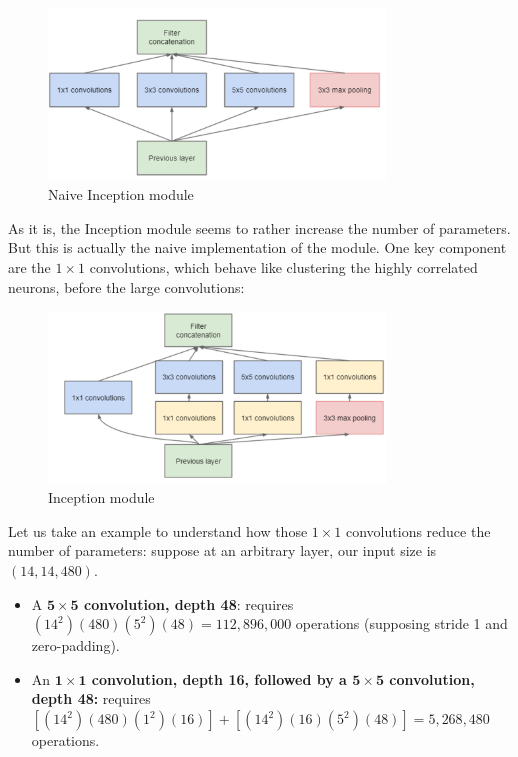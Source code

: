 \begin{figure}[H]
    \centering
    \includegraphics[width=0.8\textwidth]{Images/naiveinception.png}
    \caption{Naive Inception module \cite{googlenet}}
\end{figure}

As it is, the Inception module seems to rather increase the number of parameters. But this is actually the naive implementation of the module. One key component are the $1\times 1$ convolutions, which behave like clustering the highly correlated neurons, before the large convolutions:
\begin{figure}[H]
    \centering
    \includegraphics[width=0.8\textwidth]{Images/inception.png}
    \caption{Inception module \cite{googlenet}}
\end{figure}

Let us take an example to understand how those $1\times 1$ convolutions reduce the number of parameters: suppose at an arbitrary layer, our input size is $(14, 14, 480)$.
\begin{itemize}
\item A \textbf{$\mathbf{5\times 5}$ convolution, depth 48}: requires $(14^2)(480)(5^2)(48) = 112,896,000$ operations (supposing stride 1 and zero-padding).
\item An \textbf{$\mathbf{1\times 1}$ convolution, depth 16, followed by a $\mathbf{5\times 5}$ convolution, depth 48:} requires $[(14^2)(480)(1^2)(16)] + [(14^2)(16)(5^2)(48)] = 5,268,480$ operations.
\end{itemize}

